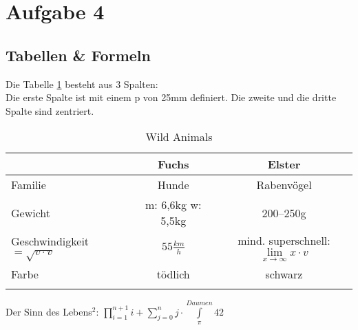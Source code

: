 \documentclass[a4paper, pdftex, ngerman, 11pt]{article}
\begin{document}
\section{Aufgabe 4}
\subsection{Tabellen \& Formeln}
Die Tabelle \ref{tab:ani} besteht aus 3 Spalten:\\
Die erste Spalte ist mit einem p von 25mm definiert. Die zweite und die dritte Spalte sind zentriert.

\begin{longtable}{p{25mm}|c|c}
& Fuchs & Elster\\
\hline
\hline
Familie & Hunde & Rabenvögel\\
\hline
Gewicht & m: 6,6kg w: 5,5kg & 200--250g\\
\hline
Geschwindigkeit $ = \sqrt{v\cdot v}$ & $55\frac{km}{h}$ & mind. superschnell: $\lim\limits_{x \rightarrow \infty} x \cdot v$ \\
\hline
Farbe & tödlich & schwarz\\
\hline
\caption{Wild Animals}
\label{tab:ani}
\end{longtable}

Der Sinn des Lebens$^2$: $\prod\limits_{i=1}^{n+1} i + \sum_{j=0}^{n} j \cdot \int\limits_{\pi}^{Daumen} 42$
\end{document}
